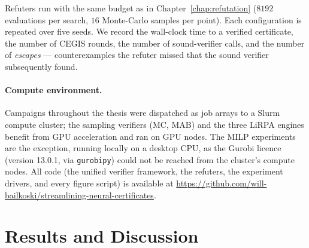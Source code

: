 Refuters run with the same budget as in Chapter~\ref{chap:refutation} ($8192$
evaluations per search, $16$ Monte-Carlo samples per point). Each
configuration is repeated over five seeds. We record the wall-clock time to a
verified certificate, the number of CEGIS rounds, the number of sound-verifier
calls, and the number of \emph{escapes} --- counterexamples the refuter
missed that the sound verifier subsequently found.

\paragraph{Compute environment.} Campaigns throughout the thesis were
dispatched as job arrays to a Slurm compute cluster; the sampling verifiers
(MC, MAB) and the three LiRPA engines benefit from GPU acceleration and ran on
GPU nodes. The MILP experiments are the exception, running locally on a
desktop CPU, as the Gurobi licence (version 13.0.1, via \texttt{gurobipy})
could not be reached from the cluster's compute nodes. All code (the
unified verifier framework, the refuters, the experiment drivers, and every
figure script) is available at
\url{https://github.com/will-bailkoski/streamlining-neural-certificates}.

\section{Results and Discussion}



